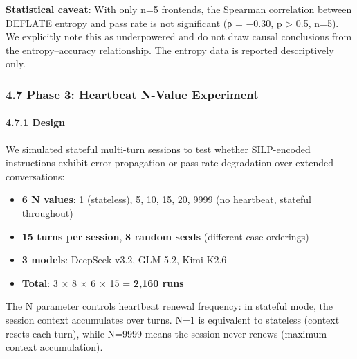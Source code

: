 \textbf{Statistical caveat}: With only n=5 frontends, the Spearman correlation between DEFLATE entropy and pass rate is not significant (ρ = −0.30, p \textgreater{} 0.5, n=5). We explicitly note this as underpowered and do not draw causal conclusions from the entropy--accuracy relationship. The entropy data is reported descriptively only.



\subsubsection{4.7 Phase 3: Heartbeat N-Value Experiment}\label{phase-3-heartbeat-n-value-experiment}



\paragraph{4.7.1 Design}\label{design-1}



We simulated stateful multi-turn sessions to test whether SILP-encoded instructions exhibit error propagation or pass-rate degradation over extended conversations:



\begin{itemize}

\tightlist

\item

  \textbf{6 N values}: 1 (stateless), 5, 10, 15, 20, 9999 (no heartbeat, stateful throughout)

\item

  \textbf{15 turns per session}, \textbf{8 random seeds} (different case orderings)

\item

  \textbf{3 models}: DeepSeek-v3.2, GLM-5.2, Kimi-K2.6

\item

  \textbf{Total}: 3 × 8 × 6 × 15 = \textbf{2,160 runs}

\end{itemize}



The N parameter controls heartbeat renewal frequency: in stateful mode, the session context accumulates over turns. N=1 is equivalent to stateless (context resets each turn), while N=9999 means the session never renews (maximum context accumulation).



